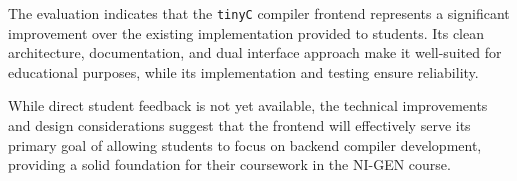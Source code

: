 The evaluation indicates that the \texttt{tinyC} compiler frontend represents a significant improvement over the existing implementation provided to students. Its clean architecture, documentation, and dual interface approach make it well-suited for educational purposes, while its implementation and testing ensure reliability.

While direct student feedback is not yet available, the technical improvements and design considerations suggest that the frontend will effectively serve its primary goal of allowing students to focus on backend compiler development, providing a solid foundation for their coursework in the NI-GEN course.